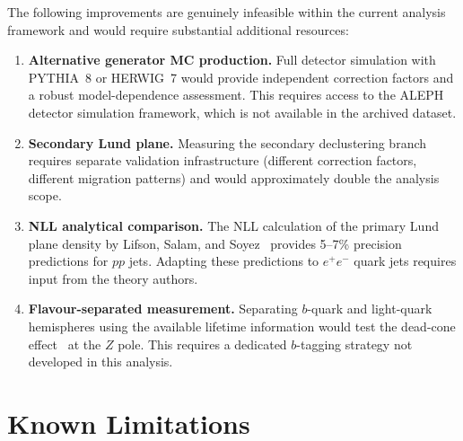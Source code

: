 \documentclass[11pt,a4paper]{article}
\begin{document}
The following improvements are genuinely infeasible within the current
analysis framework and would require substantial additional resources:

\begin{enumerate}
\item \textbf{Alternative generator MC production.}  Full detector
  simulation with PYTHIA~8 or HERWIG~7 would provide independent
  correction factors and a robust model-dependence assessment.  This
  requires access to the ALEPH detector simulation framework, which
  is not available in the archived dataset.
\item \textbf{Secondary Lund plane.}  Measuring the secondary
  declustering branch requires separate validation infrastructure
  (different correction factors, different migration patterns) and
  would approximately double the analysis scope.
\item \textbf{NLL analytical comparison.}  The NLL calculation of
  the primary Lund plane density by Lifson, Salam, and
  Soyez~\cite{Lifson:2020gua} provides 5--7\% precision predictions
  for $pp$ jets.  Adapting these predictions to $e^+e^-$ quark jets
  requires input from the theory authors.
\item \textbf{Flavour-separated measurement.}  Separating $b$-quark
  and light-quark hemispheres using the available lifetime information
  would test the dead-cone effect~\cite{LHCb:2025viq} at the $Z$ pole.
  This requires a dedicated $b$-tagging strategy not developed in this
  analysis.
\end{enumerate}

\section{Known Limitations}
\label{sec:limitations}
\end{document}
